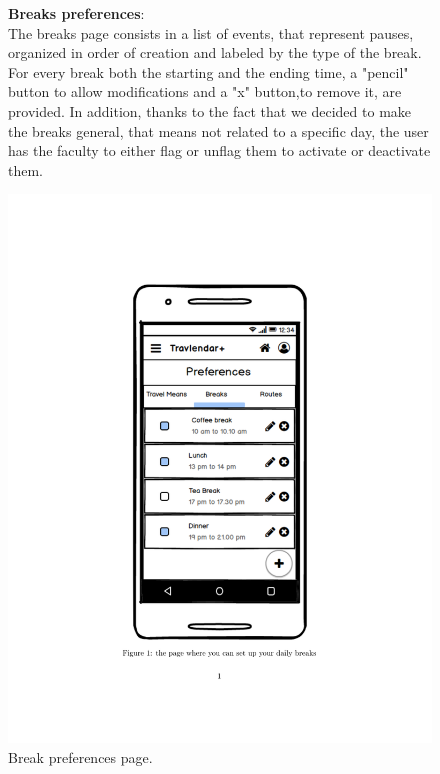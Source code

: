 		\begin{figure}
				\begin{flushleft}
				\textbf{Breaks preferences}:\\
				The breaks page consists in a list of events, that represent pauses, organized in order of creation and labeled by the type of the break. For every break  both the starting and the ending time, a "pencil" button to allow modifications and a "x" button,to remove it, are provided. In addition, thanks to the fact that we decided to make the breaks general, that means not related to a specific day, the user has the faculty to either flag or unflag them to activate or deactivate them. 
			\end{flushleft}
		\centering
		\includegraphics[width=0.6\linewidth]{mockups/PreferencesBreaks}
		\caption{Break preferences page.}
		\label{fig:preferencesbreaks}
	\end{figure}
	
